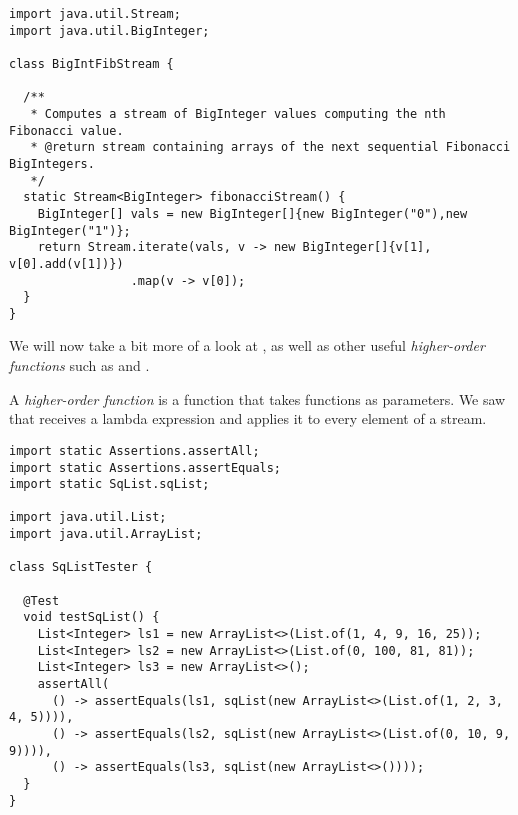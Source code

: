 \begin{cl}[]{}
\begin{lstlisting}[language=MyJava]
import java.util.Stream;
import java.util.BigInteger;

class BigIntFibStream {

  /**
   * Computes a stream of BigInteger values computing the nth Fibonacci value.
   * @return stream containing arrays of the next sequential Fibonacci BigIntegers.
   */
  static Stream<BigInteger> fibonacciStream() {
    BigInteger[] vals = new BigInteger[]{new BigInteger("0"),new BigInteger("1")};
    return Stream.iterate(vals, v -> new BigInteger[]{v[1], v[0].add(v[1])})
                 .map(v -> v[0]);
  }
}
\end{lstlisting}
\end{cl}

We will now take a bit more of a look at , as well as other useful \emph{higher-order functions} such as  and .

A \emph{higher-order function} is a function that takes functions as parameters. We saw that  receives a lambda expression and applies it to every element of a stream. 


\begin{cl}[]{}
\begin{lstlisting}[language=MyJava]
import static Assertions.assertAll;
import static Assertions.assertEquals;
import static SqList.sqList;

import java.util.List;
import java.util.ArrayList;

class SqListTester {

  @Test
  void testSqList() {
    List<Integer> ls1 = new ArrayList<>(List.of(1, 4, 9, 16, 25));
    List<Integer> ls2 = new ArrayList<>(List.of(0, 100, 81, 81));
    List<Integer> ls3 = new ArrayList<>();
    assertAll(
      () -> assertEquals(ls1, sqList(new ArrayList<>(List.of(1, 2, 3, 4, 5)))),
      () -> assertEquals(ls2, sqList(new ArrayList<>(List.of(0, 10, 9, 9)))),
      () -> assertEquals(ls3, sqList(new ArrayList<>())));
  }
}
\end{lstlisting}    
\end{cl}

